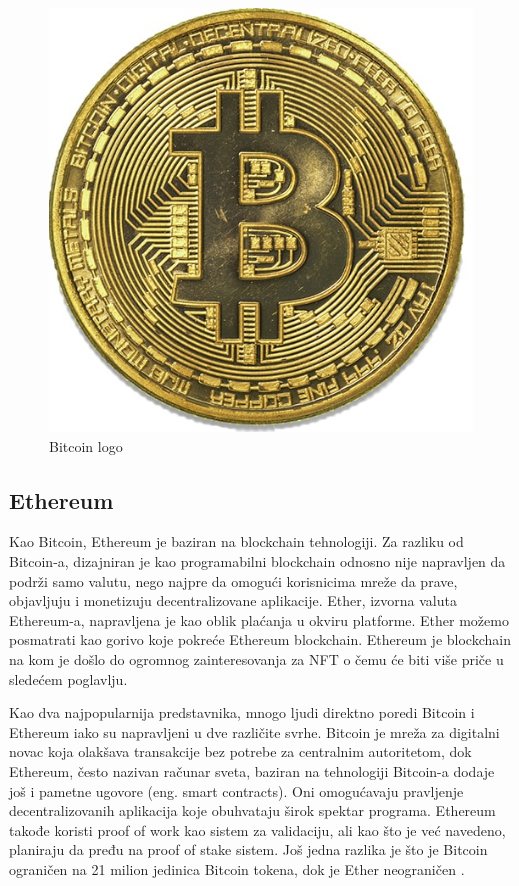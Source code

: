 \documentclass[a4paper]{article}
\begin{document}
{\begin{figure}[h!]
\begin{center}
\includegraphics[scale=0.3]{slike/slika3.jpg}
\end{center}
\caption{Bitcoin logo}
\label{fig:bitcoin}
\end{figure}


\subsection{Ethereum}
\label{subsec:ethereum}
Kao Bitcoin, Ethereum je baziran na blockchain tehnologiji. Za razliku od Bitcoin-a, dizajniran je kao programabilni blockchain odnosno nije napravljen da podrži samo valutu, nego najpre da omogući korisnicima mreže da prave, objavljuju i monetizuju decentralizovane aplikacije. Ether, izvorna valuta Ethereum-a, napravljena je kao oblik plaćanja u okviru platforme. Ether možemo posmatrati kao gorivo koje pokreće Ethereum blockchain. Ethereum je blockchain na kom je došlo do ogromnog zainteresovanja za NFT o čemu će biti više priče u sledećem poglavlju.

Kao dva najpopularnija predstavnika, mnogo ljudi direktno poredi Bitcoin i Ethereum iako su napravljeni u dve različite svrhe. Bitcoin je mreža za digitalni novac koja olakšava transakcije bez potrebe za centralnim autoritetom, dok Ethereum, često nazivan računar sveta, baziran na tehnologiji Bitcoin-a dodaje još i pametne ugovore (eng. smart contracts). Oni omogućavaju pravljenje decentralizovanih aplikacija koje obuhvataju širok spektar programa. Ethereum takođe koristi proof of work kao sistem za validaciju, ali kao što je već navedeno, planiraju da pređu na proof of stake sistem. Još jedna razlika je što je Bitcoin ograničen na 21 milion jedinica Bitcoin tokena, dok je Ether neograničen \cite{različitekriptovalute}.


}
\end{document}
